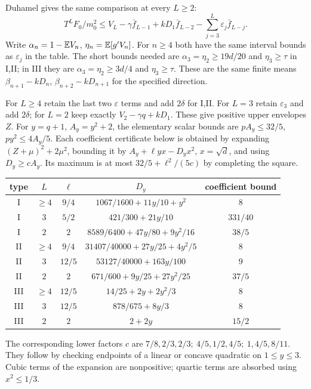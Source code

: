 Duhamel gives the same comparison at every $L\ge2$:
\[
 T^LF_0/m_0^2\le V_L-\gamma \bar f_{L-1}+kD_1\bar f_{L-2}
                         -\sum_{j=3}^L\varepsilon_j\bar f_{L-j}.
\]
Write $\alpha_n=1-\mathbb E V_n$, $\eta_n=\mathbb E[g'V_n]$.
For $n\ge4$ both have the same interval bounds as
$\varepsilon_j$ in the table. The short bounds needed are
$\alpha_3=\eta_2\ge19d/20$ and $\eta_3\ge\tau$ in I,II;
in III they are $\alpha_3=\eta_2\ge3d/4$ and $\eta_3\ge\tau$.
These are the same finite means $\beta_{n+1}-kD_n$,
$\beta_{n+2}-kD_{n+1}$ for the specified direction.

For $L\ge4$ retain the last two $\varepsilon$ terms and add
$2\delta$ for I,II. For $L=3$ retain $\varepsilon_3$ and add
$2\delta$; for $L=2$ keep exactly $V_2-\gamma q+kD_1$.
These give positive upper envelopes $Z$.
For $y=q+1$, $A_y=y^2+2$, the elementary scalar bounds are
$pA_y\le32/5$, $py^2\le4A_y/5$.
Each coefficient certificate below is obtained by expanding
$(Z+\mu)^2+2\mu^2$, bounding it by
$A_y+\ell yx-D_yx^2$, $x=\sqrt d$, and using $D_y\ge cA_y$.
Its maximum is at most $32/5+\ell^2/(5c)$ by completing the square.
\begin{center}\small
\begin{tabular}{@{}ccccc@{}}
\toprule
type & $L$ & $\ell$ & $D_y$ & coefficient bound\\\midrule
I & $\ge4$ & $9/4$ & $1067/1600+11y/10+y^2$ & $8$\\
I & $3$ & $5/2$ & $421/300+21y/10$ & $331/40$\\
I & $2$ & $2$ & $8589/6400+47y/80+9y^2/16$ & $38/5$\\
II & $\ge4$ & $9/4$ & $31407/40000+27y/25+4y^2/5$ & $8$\\
II & $3$ & $12/5$ & $53127/40000+163y/100$ & $9$\\
II & $2$ & $2$ & $671/600+9y/25+27y^2/25$ & $37/5$\\
III & $\ge4$ & $12/5$ & $14/25+2y+2y^2/3$ & $8$\\
III & $3$ & $12/5$ & $878/675+8y/3$ & $8$\\
III & $2$ & $2$ & $2+2y$ & $15/2$\\\bottomrule
\end{tabular}
\end{center}
The corresponding lower factors $c$ are
$7/8,2/3,2/3;\ 4/5,1/2,4/5;\ 1,4/5,8/11$.
They follow by checking endpoints of a linear or concave quadratic on
$1\le y\le3$. Cubic terms of the expansion are nonpositive;
quartic terms are absorbed using $x^2\le1/3$.

